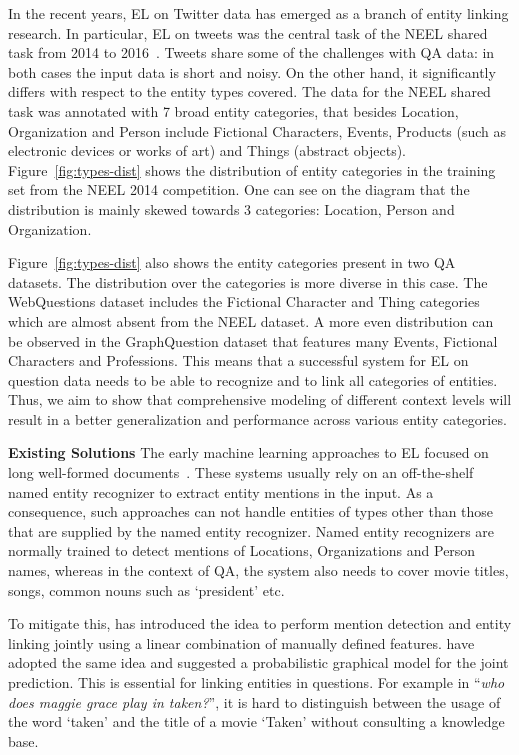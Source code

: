 \documentclass[11pt,a4paper]{article}
\begin{document}
In the recent years, EL on Twitter data has emerged as a branch of entity linking research. In particular, EL on tweets was the central task of the NEEL shared task from 2014 to 2016~\cite{Hotho2016}. Tweets share some of the challenges with QA data: in both cases the input data is short and noisy. On the other hand, it significantly differs with respect to the entity types covered. The data for the NEEL shared task was annotated with 7 broad entity categories, that besides Location, Organization and Person include Fictional Characters, Events, Products (such as electronic devices or works of art) and Things (abstract objects). Figure~\ref{fig:types-dist} shows the distribution of entity categories in the training set from the NEEL 2014 competition. One can see on the diagram that the distribution is mainly skewed towards 3 categories: Location, Person and Organization. 

Figure~\ref{fig:types-dist} also shows the entity categories present in two QA datasets. The distribution over the categories is more diverse in this case. The WebQuestions dataset includes the Fictional Character and Thing categories which are almost absent from the NEEL dataset. A more even distribution can be observed in the GraphQuestion dataset that features many Events, Fictional Characters and Professions. This means that a successful system for EL on question data needs to be able to recognize and to link all categories of entities. Thus, we aim to show that comprehensive modeling of different context levels will result in a better generalization and performance across various entity categories.

\textbf{Existing Solutions} 
The early machine learning approaches to EL focused on long well-formed documents~\cite{Bunescu2006,Cucerzan2007,Han2012,Francis-Landau2016}. These systems usually rely on an off-the-shelf named entity recognizer to extract entity mentions in the input. 
As a consequence, such approaches can not handle entities of types other than those that are supplied by the named entity recognizer.
Named entity recognizers are normally trained to detect mentions of Locations, Organizations and Person names, whereas in the context of QA, the system also needs to cover movie titles, songs, common nouns such as `president' etc. 

To mitigate this, \citet{Cucerzan2012} has introduced the idea to perform mention detection and entity linking jointly using a linear combination of manually defined features. \citet{Luo2015a} have adopted the same idea and suggested a probabilistic graphical model for the joint prediction.
This is essential for linking entities in questions. For example in ``\textit{who does maggie grace play in taken?}'', it is hard to distinguish between the usage of the word `taken' and the title of a movie `Taken' without consulting a knowledge base.
\end{document}
